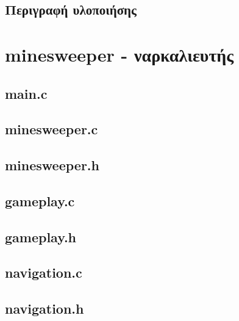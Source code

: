 \documentclass{article}
\begin{document}
    \subsection{Περιγραφή υλοποιήσης}


\section{minesweeper - ναρκαλιευτής}

    \subsection{main.c}
        

    \subsection{minesweeper.c}
        

    \subsection{minesweeper.h}
        

    \subsection{gameplay.c}
        

    \subsection{gameplay.h}
        

    \subsection{navigation.c}
        

    \subsection{navigation.h}
        
\end{document}
